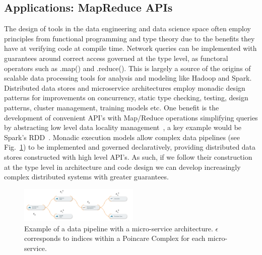 \documentclass[runningheads]{llncs}
\begin{document}
\subsection{Applications: MapReduce APIs}
The design of tools in the data engineering and data science space often employ principles from functional programming and type theory due to the benefits they have at verifying code at compile time. Network queries can be implemented with guarantees around correct access governed at the type level, as functoral operators such as .map() and .reduce(). This is largely a source of the origins of scalable data processing tools for analysis and modeling like Hadoop and Spark. Distributed data stores and microservice architectures employ monadic design patterns for improvements on concurrency, static type checking, testing, design patterns, cluster management, training models etc. One benefit is the development of convenient API's with Map/Reduce operations simplifying queries by abstracting low level data locality management~\cite{ref_book2}, a key example would be Spark's RDD~\cite{ref_url1}. Monadic execution models allow complex data pipelines (see Fig.~\ref{fig3}) to be implemented and governed declaratively, providing distributed data stores constructed with high level API's. As such, if we follow their construction at the type level in architecture and code design we can develop increasingly complex distributed systems with greater guarantees.
\begin{figure}
\centering
\includegraphics[height=1.7cm,width=0.55\columnwidth]{data-pipeline.png}
\caption{Example of a data pipeline with a micro-service architecture. $\epsilon$ corresponds to indices within a Poincare Complex for each micro-service.} \label{fig3}
\end{figure}
\end{document}
